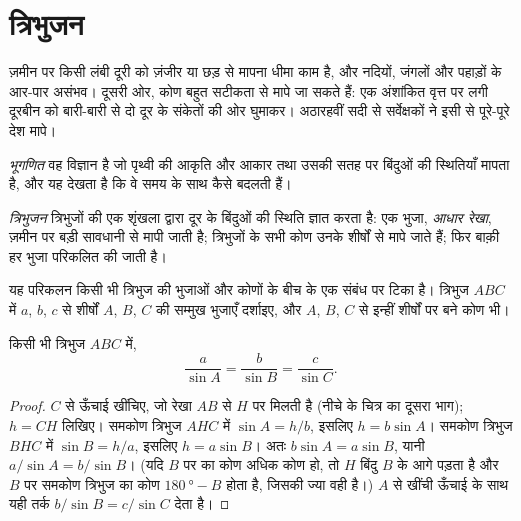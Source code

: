 \section{त्रिभुजन}

ज़मीन पर किसी लंबी दूरी को ज़ंजीर या छड़ से मापना धीमा काम है, और नदियों, जंगलों और
पहाड़ों के आर-पार असंभव। दूसरी ओर, कोण बहुत सटीकता से मापे जा सकते हैं: एक अंशांकित
वृत्त पर लगी दूरबीन को बारी-बारी से दो दूर के संकेतों की ओर घुमाकर। अठारहवीं सदी से
सर्वेक्षकों ने इसी से पूरे-पूरे देश मापे।

\begin{definition}[भूगणित]\label{def:g10:measuring-the-earth:geodesy}
\emph{भूगणित} वह विज्ञान है जो पृथ्वी की आकृति और आकार तथा उसकी सतह
पर बिंदुओं की स्थितियाँ मापता है, और यह देखता है कि वे समय के साथ कैसे
बदलती हैं।
\end{definition}

\begin{definition}[त्रिभुजन]\label{def:g10:measuring-the-earth:triangulation}
\emph{त्रिभुजन} त्रिभुजों की एक शृंखला द्वारा दूर के बिंदुओं की स्थिति
ज्ञात करता है: एक भुजा, \emph{आधार रेखा}, ज़मीन पर बड़ी सावधानी से मापी जाती है;
त्रिभुजों के सभी कोण उनके शीर्षों से मापे जाते हैं; फिर बाक़ी हर भुजा परिकलित की
जाती है।
\end{definition}

यह परिकलन किसी भी त्रिभुज की भुजाओं और कोणों के बीच के एक संबंध पर टिका है। त्रिभुज
$ABC$ में $a$, $b$, $c$ से शीर्षों $A$, $B$, $C$ की सम्मुख भुजाएँ दर्शाइए, और
$A$, $B$, $C$ से इन्हीं शीर्षों पर बने कोण भी।

\begin{proposition}[ज्या नियम]\label{prop:g10:measuring-the-earth:sine-rule}
किसी भी त्रिभुज $ABC$ में,
\[
  \frac{a}{\sin A} = \frac{b}{\sin B} = \frac{c}{\sin C}.
\]
\end{proposition}

\begin{proof}
$C$ से ऊँचाई खींचिए, जो रेखा $AB$ से $H$ पर मिलती है (नीचे के चित्र का दूसरा भाग);
$h = CH$ लिखिए। समकोण त्रिभुज $AHC$ में $\sin A = h/b$,
इसलिए $h = b \sin A$। समकोण त्रिभुज $BHC$ में $\sin B = h/a$, इसलिए
$h = a \sin B$। अतः $b \sin A = a \sin B$, यानी $a/\sin A = b/\sin B$।
(यदि $B$ पर का कोण अधिक कोण हो, तो $H$ बिंदु $B$ के आगे पड़ता है और $B$ पर समकोण
त्रिभुज का कोण $\qty{180}{\degree} - B$ होता है, जिसकी ज्या वही है।)
$A$ से खींची ऊँचाई के साथ यही तर्क $b/\sin B = c/\sin C$ देता है।
\end{proof}

